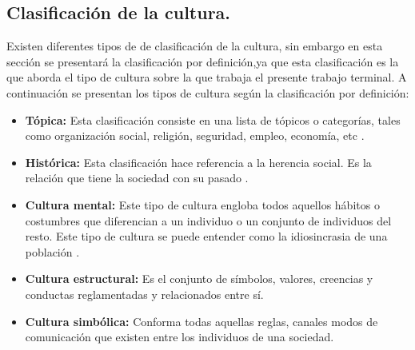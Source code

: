         \subsection{Clasificación de la cultura.}\label{CulturaClasi}
        Existen diferentes tipos de de clasificación de la cultura, sin embargo 
        en esta sección se presentará la clasificación por definición,ya que esta 
        clasificación es la que aborda el tipo de cultura sobre la que trabaja el 
        presente trabajo terminal. A continuación se presentan los tipos de cultura 
        según la clasificación por definición:
        \begin{itemize}
                \item \textbf{Tópica:} Esta clasificación consiste en una lista de 
                tópicos o categorías, tales como organización social, religión, 
                seguridad, empleo, economía, etc \cite{RefculturaClasificacion}.
                \item \textbf{Histórica:} Esta clasificación hace referencia a la 
                herencia social. Es la relación que tiene la sociedad con su pasado
                \cite{RefculturaClasificacionEl}. 
                \item \textbf{Cultura mental:} Este tipo de cultura engloba todos 
                aquellos hábitos o costumbres que diferencian a un individuo o un 
                conjunto de individuos del resto. Este tipo de cultura se puede 
                entender como la idiosincrasia de una población
                \cite{RefculturaClasificacion}.
                \item \textbf{Cultura estructural:} Es el conjunto de símbolos, 
                valores, creencias y conductas reglamentadas y relacionados entre 
                sí\cite{RefculturaClasificacionEl}. 
                \item \textbf{Cultura simbólica:} Conforma todas aquellas reglas, 
                canales  modos de comunicación que existen entre los individuos 
                de una sociedad\cite{RefculturaClasificacion}.
        \end{itemize}
